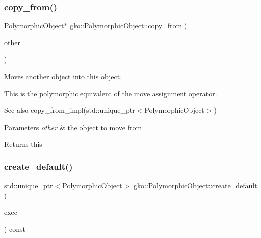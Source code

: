 \subsubsection{\texorpdfstring{copy\+\_\+from()}{copy\_from()}\hspace{0.1cm}{\footnotesize\ttfamily [2/2]}}
{\footnotesize\ttfamily \hyperlink{classgko_1_1PolymorphicObject}{Polymorphic\+Object}$\ast$ gko\+::\+Polymorphic\+Object\+::copy\+\_\+from (\begin{DoxyParamCaption}\item[{std\+::unique\+\_\+ptr$<$ \hyperlink{classgko_1_1PolymorphicObject}{Polymorphic\+Object} $>$}]{other }\end{DoxyParamCaption})}



Moves another object into this object. 

This is the polymorphic equivalent of the move assignment operator.

\begin{DoxySeeAlso}{See also}
copy\+\_\+from\+\_\+impl(std\+::unique\+\_\+ptr$<$\+Polymorphic\+Object$>$)
\end{DoxySeeAlso}

\begin{DoxyParams}{Parameters}
{\em other} & the object to move from\\
\hline
\end{DoxyParams}
\begin{DoxyReturn}{Returns}
this 
\end{DoxyReturn}
\mbox{\label{classgko_1_1PolymorphicObject_aca2ad91eee15e667cc0e7d1444a6de47}} 
\subsubsection{\texorpdfstring{create\+\_\+default()}{create\_default()}\hspace{0.1cm}{\footnotesize\ttfamily [1/2]}}
{\footnotesize\ttfamily std\+::unique\+\_\+ptr$<$\hyperlink{classgko_1_1PolymorphicObject}{Polymorphic\+Object}$>$ gko\+::\+Polymorphic\+Object\+::create\+\_\+default (\begin{DoxyParamCaption}\item[{std\+::shared\+\_\+ptr$<$ const \hyperlink{classgko_1_1Executor}{Executor} $>$}]{exec }\end{DoxyParamCaption}) const}



